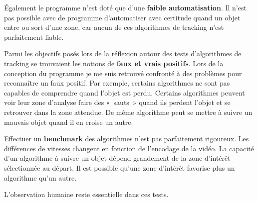     Également le programme n'est doté que d'une \textbf{faible automatisation}. Il n'est pas possible avec de programme d'automatiser avec certitude quand un objet entre ou sort d'une zone, car aucun de ces algorithmes de tracking n'est parfaitement fiable. 

  Parmi les objectifs posés lors de la réflexion autour des tests d'algorithmes de tracking se trouvaient les notions de \textbf{faux et vrais positifs}. Lors de la conception du programme je me suis retrouvé confronté à des problèmes pour reconnaître un faux positif. Par exemple, certains algorithmes ne sont pas capables de comprendre quand l'objet est perdu. Certains algorithmes peuvent voir leur zone d'analyse faire des «~sauts~» quand ils perdent l'objet et se retrouver dans la zone attendue. De même algorithme peut se mettre à suivre un mauvais objet quand il en croise un autre. 

 Effectuer un \textbf{benchmark} des algorithmes n'est pas parfaitement rigoureux. Les différences de vitesses changent en fonction de l'encodage de la vidéo. La capacité d'un algorithme à suivre un objet dépend grandement de la zone d’intérêt sélectionnée au départ. Il est possible qu'une zone d’intérêt favorise plus un algorithme qu'un autre.
 
 L'observation humaine reste essentielle dans ces tests.